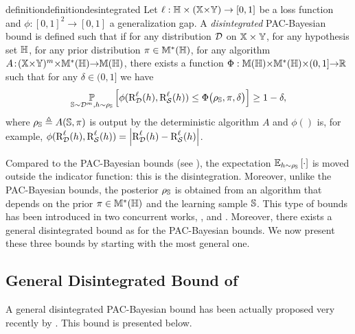 \begin{restatable}{definition}{definitiondesintegrated}\label{chap:pac-bayes:def:disintegrated-pac-bayes}
Let $\loss: \H \times(\X{\times}\Y)\rightarrow [0,1]$ be a loss function and $\phi: [0,1]^2{\to}[0,1]$ a generalization gap. 
A {\it disintegrated} PAC-Bayesian bound is defined such that if for any distribution $\D$ on $\X\times\Y$, for any hypothesis set $\H$, for any prior distribution $\P\in\M^{*}(\H)$, for any algorithm \mbox{$A\!:\!(\X{\times}\Y)^{\m}{\times}\M^{*}(\H){\to} \M(\H)$}, there exists a function $\Phi: \M(\H){\times}\M^{*}(\H){\times}(0,1]{\to} \Rbb$ such that for any $\delta\in(0, 1]$ we have
\begin{align*}
    \PP_{\S\sim\D^\m, \h\sim\AQ}\LB \phi(\RiskLoss_{\D}(\h), \RiskLoss_{\dS}(\h)) \le \Phi\big(\AQ, \P, \delta\big) \RB \ge 1-\delta,
\end{align*}
where $\AQ \defeq A(\S, \P)$ is output by the deterministic algorithm $A$ and $\phi()$ is, for example, $\phi(\RiskLoss_{\D}(\h), \RiskLoss_{\dS}(\h)) = \LN\RiskLoss_{\D}(\h)-\RiskLoss_{\dS}(\h)\RN$.
\end{restatable}


Compared to the PAC-Bayesian bounds (see ), the expectation $\EE_{\h\sim\AQ}\LB\cdot\RB$ is moved outside the indicator function: this is the disintegration.
Moreover, unlike the PAC-Bayesian bounds, the posterior $\AQ$ is obtained from an algorithm that depends on the prior $\P\in\M^{*}(\H)$ and the learning sample $\S$.
This type of bounds has been introduced in two concurrent works, \ie, \citet[Theorem~1.2.7]{Catoni2007} and \citet{BlanchardFleuret2007}.
Moreover, there exists a general disintegrated bound as for the PAC-Bayesian bounds.
We now present these three bounds by starting with the most general one.

\subsection{General Disintegrated Bound of \citet{RivasplataKuzborskijSzepesvariShaweTaylor2020}}

A general disintegrated PAC-Bayesian bound has been actually proposed very recently by \citet[Theorem~1-(i)]{RivasplataKuzborskijSzepesvariShaweTaylor2020}. 
This bound is presented below.

